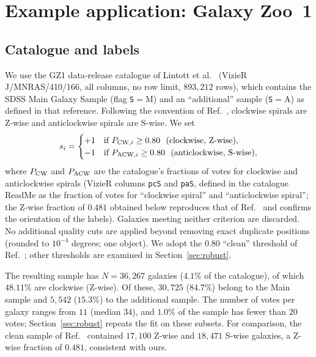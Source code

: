\documentclass[preprint,12pt]{elsarticle}
\begin{document}
\section{Example application: Galaxy Zoo~1}
\label{sec:application}

\subsection{Catalogue and labels}

We use the GZ1 data-release catalogue of Lintott et al.\ \cite{Lintott2011} (VizieR J/MNRAS/410/166, all columns, no row limit, $893{,}212$ rows), which contains the SDSS Main Galaxy Sample (flag \texttt{S}$=$M) and an ``additional'' sample (\texttt{S}$=$A) as defined in that reference.
Following the convention of Ref.~\cite{Land2008}, clockwise spirals are Z-wise and anticlockwise spirals are S-wise.
We set
\begin{equation}
    s_i =
    \begin{cases}
      +1 & \text{if } P_{{\rm CW},i} \ge 0.80 \ \ (\text{clockwise, Z-wise}),\\
      -1 & \text{if } P_{{\rm ACW},i} \ge 0.80 \ \ (\text{anticlockwise, S-wise}),
    \end{cases}
\end{equation}
where $P_{\rm CW}$ and $P_{\rm ACW}$ are the catalogue's fractions of votes for clockwise and anticlockwise spirals (VizieR columns \texttt{pcS} and \texttt{paS}, defined in the catalogue ReadMe as the fraction of votes for ``clockwise spiral'' and ``anticlockwise spiral''; the Z-wise fraction of $0.481$ obtained below reproduces that of Ref.~\cite{Land2008} and confirms the orientation of the labels).
Galaxies meeting neither criterion are discarded.
No additional quality cuts are applied beyond removing exact duplicate positions (rounded to $10^{-4}$ degrees; one object).
We adopt the $0.80$ ``clean'' threshold of Ref.~\cite{Land2008}; other thresholds are examined in Section~\ref{sec:robust}.

The resulting sample has $N = 36{,}267$ galaxies ($4.1\%$ of the catalogue), of which $48.11\%$ are clockwise (Z-wise).
Of these, $30{,}725$ ($84.7\%$) belong to the Main sample and $5{,}542$ ($15.3\%$) to the additional sample.
The number of votes per galaxy ranges from $11$ (median $34$), and $1.0\%$ of the sample has fewer than $20$ votes; Section~\ref{sec:robust} repeats the fit on these subsets.
For comparison, the clean sample of Ref.~\cite{Land2008} contained $17{,}100$ Z-wise and $18{,}471$ S-wise galaxies, a Z-wise fraction of $0.481$, consistent with ours.
\end{document}
